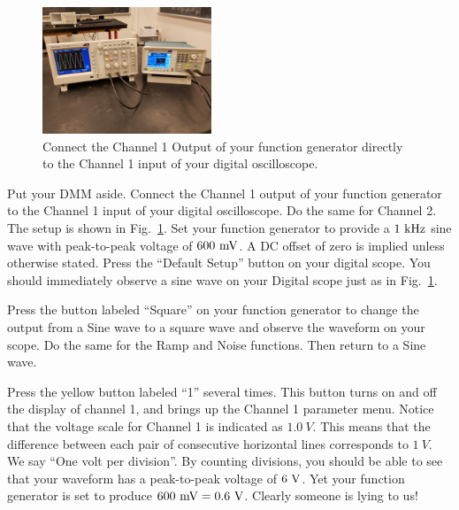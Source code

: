 \begin{figure}[htbp]
\begin{center}
\includegraphics[width=0.45\textwidth]{figs/labs/lissajous/scope_setup.jpg} 
\caption{Connect the Channel 1 Output of your function generator directly to the Channel 1 input of your digital oscilloscope.}
\label{fig:scope_setup}
\end{center}
\end{figure}

Put your DMM aside.  Connect the Channel 1 output of your function
generator to the Channel 1 input of your digital oscilloscope.  Do the
same for Channel 2.  The setup is shown in Fig.~\ref{fig:scope_setup}.
Set your function generator to provide a $1~\rm kHz$ sine wave with
peak-to-peak voltage of $600~\rm mV$.  A DC offset of zero is implied
unless otherwise stated. Press the ``Default Setup'' button on your
digital scope.  You should immediately observe a sine wave on your
Digital scope just as in Fig.~\ref{fig:scope_setup}.

Press the button labeled ``Square'' on your function generator to
change the output from a Sine wave to a square wave and observe the
waveform on your scope.  Do the same for the Ramp and
Noise functions.  Then return to a Sine wave.

Press the yellow button labeled ``1'' several times.  This button
turns on and off the display of channel 1, and brings up the Channel 1
parameter menu.  Notice that the voltage scale for Channel 1 is
indicated as $1.0~V$.  This means that the difference between each
pair of consecutive horizontal lines corresponds to $1~V$.  We say
``One volt per division''.  By counting divisions, you should be able
to see that your waveform has a peak-to-peak voltage of $6~\rm V$.
Yet your function generator is set to produce $600~\rm mV = 0.6~\rm
V$.  Clearly someone is lying to us!

